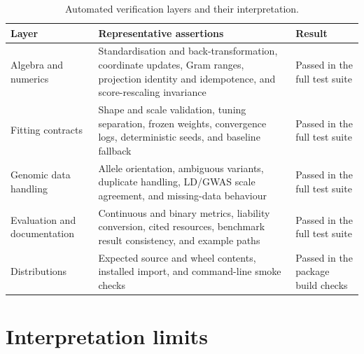 \documentclass[11pt,a4paper]{article}
\begin{document}
\begin{table}[ht]
\centering
\caption{Automated verification layers and their interpretation.}
\label{tab:verification}
\small
\begin{tabularx}{\linewidth}{@{}L{34mm}Y L{37mm}@{}}
\toprule
\textbf{Layer} & \textbf{Representative assertions} &
\textbf{Result} \\
\midrule
Algebra and numerics & Standardisation and back-transformation,
coordinate updates, Gram ranges, projection identity and
idempotence, and score-rescaling invariance & Passed in the
full test suite \\
Fitting contracts & Shape and scale validation, tuning
separation, frozen weights, convergence logs, deterministic
seeds, and baseline fallback & Passed in the full test suite \\
Genomic data handling & Allele orientation, ambiguous variants,
duplicate handling, LD/GWAS scale agreement, and missing-data
behaviour & Passed in the full test suite \\
Evaluation and documentation & Continuous and binary metrics,
liability conversion, cited resources, benchmark result
consistency, and example paths & Passed in the full test suite \\
Distributions & Expected source and wheel contents, installed
import, and command-line smoke checks & Passed in the package
build checks \\
\bottomrule
\end{tabularx}
\end{table}

\section{Interpretation limits}
\label{sec:limits}
\end{document}
